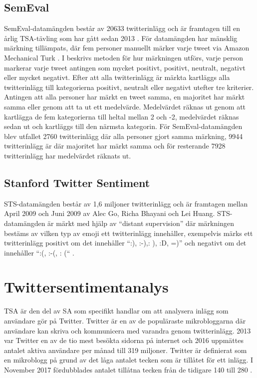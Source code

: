 \documentclass{kaumasters} %
\begin{document}
\subsection{SemEval} \label{DSse}
SemEval-datamängden består av 20633 twitterinlägg och är framtagen till en årlig TSA-tävling som har gått sedan 2013 \cite{SemEval:002}. 
För datamängden har mänsklig märkning tillämpats, där fem personer manuellt märker varje tweet via Amazon Mechanical Turk \cite{SemEval:003}.
I \cite{SemEval:004} beskrivs metoden för hur märkningen utförs, varje person markerar varje tweet antingen som mycket positivt, positivt, neutralt, negativt eller mycket negativt. Efter att alla twitterinlägg är märkta kartläggs alla twitterinlägg till kategorierna positivt, neutralt eller negativt utefter tre kriterier. Antingen att alla personer har märkt en tweet samma, en majoritet har märkt samma eller genom att ta ut ett medelvärde. Medelvärdet räknas ut genom att kartlägga de fem kategorierna till heltal mellan 2 och -2, medelvärdet räknas sedan ut och kartläggs till den närmsta kategorin. För SemEval-datamängden blev utfallet 2760 twitterinlägg där alla personer gjort samma märkning, 9944 twitterinlägg är där majoritet har märkt samma och för resterande 7928 twitterinlägg har medelvärdet räknats ut. 

\subsection{Stanford Twitter Sentiment} \label{DSsts}
STS-datamängden består av 1,6 miljoner twitterinlägg och är framtagen mellan April 2009 och Juni 2009 av Alec Go, Richa Bhayani och Lei Huang. STS-datamängden är märkt med hjälp av “distant supervision” där märkningen bestäms av vilken typ av emoji \cite{wiki:010} ett twitterinlägg innehåller, exempelvis märks ett twitterinlägg positivt om det innehåller “:), :-),: ), :D, =)” och negativt om det innehåller “:(, :-(, : (“ \cite{sts:001}. 

\section{Twittersentimentanalys} \label{TSA}
TSA är den del av SA som specifikt handlar om att analysera inlägg som användare gör på Twitter. Twitter är en av de populäraste mikrobloggarna där användare kan skriva och kommunicera med varandra genom twitterinlägg. 2013 var Twitter en av de tio mest besökta sidorna på internet och 2016 uppmättes antalet aktiva användare per månad till 319 miljoner. Twitter är definierat som en mikroblogg på grund av det låga antalet tecken som är tillåtet för ett inlägg. I November 2017 fördubblades antalet tillåtna tecken från de tidigare 140 till 280 \cite{wiki:008}. 
\end{document}
